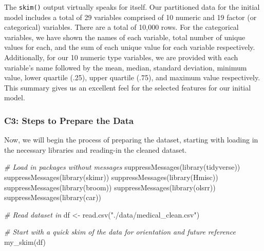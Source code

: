 \documentclass[
]{article}
\newenvironment{Shaded}{\begin{snugshade}}{\end{snugshade}}
\newcommand{\CommentTok}[1]{\textcolor[rgb]{0.56,0.35,0.01}{\textit{#1}}}
\newcommand{\FunctionTok}[1]{\textcolor[rgb]{0.00,0.00,0.00}{#1}}
\newcommand{\NormalTok}[1]{#1}
\newcommand{\OtherTok}[1]{\textcolor[rgb]{0.56,0.35,0.01}{#1}}
\newcommand{\StringTok}[1]{\textcolor[rgb]{0.31,0.60,0.02}{#1}}
\begin{document}
The \texttt{skim()} output virtually speaks for itself. Our partitioned
data for the initial model includes a total of 29 variables comprised of
10 numeric and 19 factor (or categorical) variables. There are a total
of 10,000 rows. For the categorical variables, we have shown the names
of each variable, total number of unique values for each, and the sum of
each unique value for each variable respectively. Additionally, for our
10 numeric type variables, we are provided with each variable's name
followed by the mean, median, standard deviation, minimum value, lower
quartile (.25), upper quartile (.75), and maximum value respectively.
This summary gives us an excellent feel for the selected features for
our initial model.

\hypertarget{c3-steps-to-prepare-the-data}{%
\subsubsection{C3: Steps to Prepare the
Data}\label{c3-steps-to-prepare-the-data}}

Now, we will begin the process of preparing the dataset, starting with
loading in the necessary libraries and reading-in the cleaned dataset.

\begin{Shaded}
\begin{Highlighting}[]
\CommentTok{\# Load in packages without messages}
\FunctionTok{suppressMessages}\NormalTok{(}\FunctionTok{library}\NormalTok{(tidyverse))}
\FunctionTok{suppressMessages}\NormalTok{(}\FunctionTok{library}\NormalTok{(skimr))}
\FunctionTok{suppressMessages}\NormalTok{(}\FunctionTok{library}\NormalTok{(Hmisc))}
\FunctionTok{suppressMessages}\NormalTok{(}\FunctionTok{library}\NormalTok{(broom))}
\FunctionTok{suppressMessages}\NormalTok{(}\FunctionTok{library}\NormalTok{(olsrr))}
\FunctionTok{suppressMessages}\NormalTok{(}\FunctionTok{library}\NormalTok{(car))}
\end{Highlighting}
\end{Shaded}

\begin{Shaded}
\begin{Highlighting}[]
\CommentTok{\# Read dataset in}
\NormalTok{df }\OtherTok{\textless{}{-}} \FunctionTok{read.csv}\NormalTok{(}\StringTok{"./data/medical\_clean.csv"}\NormalTok{)}

\CommentTok{\# Start with a quick skim of the data for orientation and future reference}
\FunctionTok{my\_skim}\NormalTok{(df)}
\end{Highlighting}
\end{Shaded}
\end{document}
